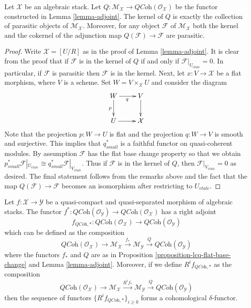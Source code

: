 \begin{lemma}
\label{lemma-adjoint-kernel-parasitic}
Let $\mathcal{X}$ be an algebraic stack.
Let $Q : \mathcal{M}_\mathcal{X} \to \textit{QCoh}(\mathcal{O}_\mathcal{X})$
be the functor constructed in Lemma \ref{lemma-adjoint}.
The kernel of $Q$ is exactly the collection of parasitic objects
of $\mathcal{M}_\mathcal{X}$. Moreover, for any object $\mathcal{F}$
of $\mathcal{M}_\mathcal{X}$ both the kernel and the cokernel of the
adjunction map $Q(\mathcal{F}) \to \mathcal{F}$ are parasitic.
\end{lemma}

\begin{proof}
Write $\mathcal{X} = [U/R]$ as in the proof of Lemma \ref{lemma-adjoint}.
It is clear from the proof that if $\mathcal{F}$ is in the kernel
of $Q$ if and only if $\mathcal{F}|_{U_{\acute{e}tale}} = 0$.
In particular, if $\mathcal{F}$ is parasitic then $\mathcal{F}$ is in
the kernel. Next, let $x : V \to \mathcal{X}$ be a flat morphism, where
$V$ is a scheme. Set $W = V \times_\mathcal{X} U$ and consider the diagram
$$
\xymatrix{
W \ar[d]_p \ar[r]_q & V \ar[d] \\
U \ar[r] & \mathcal{X}
}
$$
Note that the projection $p : W \to U$ is flat and the projection
$q : W \to V$ is smooth and surjective. This implies that $q_{small}^*$
is a faithful functor on quasi-coherent modules. By assumption $\mathcal{F}$
has the flat base change property so that we obtain
$p_{small}^*\mathcal{F}|_{U_{\acute{e}tale}} \cong
q_{small}^*\mathcal{F}|_{V_{\acute{e}tale}}$. Thus if $\mathcal{F}$
is in the kernel of $Q$, then $\mathcal{F}|_{V_{\acute{e}tale}} = 0$
as desired. The final statement follows from the remarks above and the fact
that the map $Q(\mathcal{F}) \to \mathcal{F}$ becomes an isomorphism after
restricting to $U_{\acute{e}tale}$.
\end{proof}

\begin{proposition}
\label{proposition-direct-image-quasi-coherent}
Let $f : \mathcal{X} \to \mathcal{Y}$ be a quasi-compact and quasi-separated
morphism of algebraic stacks. The functor
$f^* : \textit{QCoh}(\mathcal{O}_\mathcal{Y}) \to
\textit{QCoh}(\mathcal{O}_\mathcal{X})$
has a right adjoint
$$
f_{\textit{QCoh}, *} :
\textit{QCoh}(\mathcal{O}_\mathcal{X})
\longrightarrow
\textit{QCoh}(\mathcal{O}_\mathcal{Y})
$$
which can be defined as the composition
$$
\textit{QCoh}(\mathcal{O}_\mathcal{X}) \to \mathcal{M}_\mathcal{X}
\xrightarrow{f_*} \mathcal{M}_\mathcal{Y}
\xrightarrow{Q} \textit{QCoh}(\mathcal{O}_\mathcal{Y})
$$
where the functors $f_*$ and $Q$ are as in
Proposition \ref{proposition-lcq-flat-base-change}
and
Lemma \ref{lemma-adjoint}.
Moreover, if we define $R^if_{\textit{QCoh}, *}$ as the composition
$$
\textit{QCoh}(\mathcal{O}_\mathcal{X}) \to \mathcal{M}_\mathcal{X}
\xrightarrow{R^if_*} \mathcal{M}_\mathcal{Y}
\xrightarrow{Q} \textit{QCoh}(\mathcal{O}_\mathcal{Y})
$$
then the sequence of functors $\{R^if_{\textit{QCoh}, *}\}_{i \geq 0}$
forms a cohomological $\delta$-functor.
\end{proposition}


